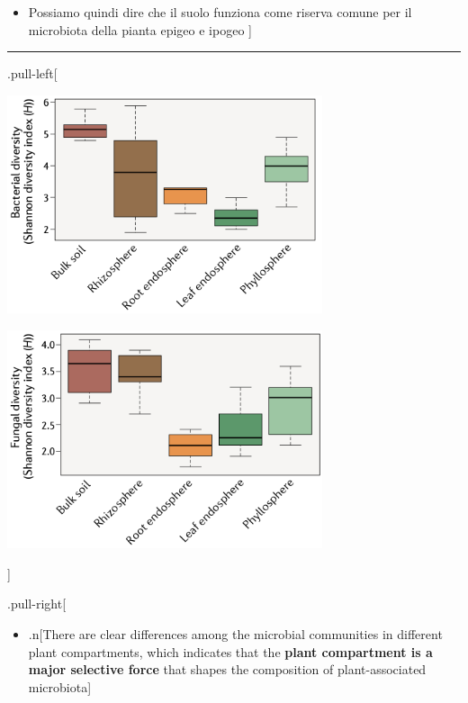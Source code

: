 \documentclass[
]{article}
\providecommand{\tightlist}{%
  \setlength{\itemsep}{0pt}\setlength{\parskip}{0pt}}
\begin{document}
\begin{itemize}
\tightlist
\item
  Possiamo quindi dire che il suolo funziona come riserva comune per il
  microbiota della pianta epigeo e ipogeo {]}
\end{itemize}

\begin{center}\rule{0.5\linewidth}{0.5pt}\end{center}

.pull-left{[}

\begin{center}\includegraphics[width=350px]{images/bacterialDiv} \end{center}

\begin{center}\includegraphics[width=350px]{images/fungalDiv} \end{center}

{]}

.pull-right{[}

\begin{itemize}
\tightlist
\item
  .n{[}There are clear differences among the microbial communities in
  different plant compartments, which indicates that the \textbf{plant
  compartment is a major selective force} that shapes the composition of
  plant-associated microbiota{]}
\end{itemize}
\end{document}
